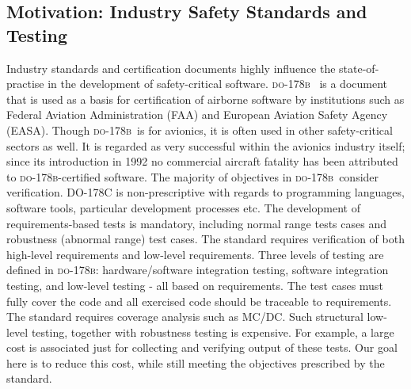 \documentclass[sttt,draft]{svjour}
\newcommand{\DOB}{\textsc{do-178b}}
\begin{document}
\subsection{Motivation: Industry Safety Standards and Testing}
Industry standards and certification documents highly influence the
state-of-practise in the development of safety-critical
software. \DOB\ \cite{do178b} is a document that is used as a basis
for certification of airborne software by institutions such as Federal
Aviation Administration (FAA) and European Aviation Safety Agency
(EASA). Though \DOB\ is for avionics, it is often used in other
safety-critical sectors as well. It is regarded as very successful
within the avionics industry itself; since its introduction in 1992 no
commercial aircraft fatality has been attributed to \DOB-certified
software. The majority of objectives in \DOB\ consider
verification. DO-178C is non-prescriptive with regards to programming
languages, software tools, particular development processes etc. The
development of requirements-based tests is mandatory, including normal
range tests cases and robustness (abnormal range) test cases. The
standard requires verification of both high-level requirements and
low-level requirements. Three levels of testing are defined in \DOB:
hardware/software integration testing, software integration testing,
and low-level testing - all based on requirements. The test cases must
fully cover the code and all exercised code should be traceable to
requirements. The standard requires coverage analysis such as
MC/DC. Such structural low-level testing, together with robustness
testing is expensive. For example, a large cost is associated just for
collecting and verifying output of these tests. Our goal here is to
reduce this cost, while still meeting the objectives prescribed by the
standard.
\end{document}
